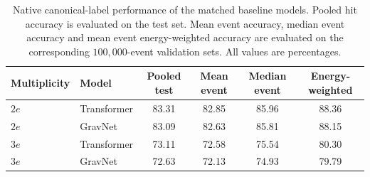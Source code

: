 \begin{table}[htbp]
    \centering
    \small
    \setlength{\tabcolsep}{5pt}
    \caption{Native canonical-label performance of the matched baseline
    models. Pooled hit accuracy is evaluated on the test set. Mean event
    accuracy, median event accuracy and mean event energy-weighted accuracy
    are evaluated on the corresponding \(100{,}000\)-event validation sets.
    All values are percentages.}
    \label{tab:results_baseline_performance}
    \begin{tabular}{llcccc}
        \hline
        Multiplicity & Model & Pooled test & Mean event & Median event & Energy-weighted \\
        \hline
        \(2e\) & Transformer & 83.31 & 82.85 & 85.96 & 88.36 \\
        \(2e\) & GravNet & 83.09 & 82.63 & 85.81 & 88.15 \\
        \(3e\) & Transformer & 73.11 & 72.58 & 75.54 & 80.30 \\
        \(3e\) & GravNet & 72.63 & 72.13 & 74.93 & 79.79 \\
        \hline
    \end{tabular}
\end{table}
